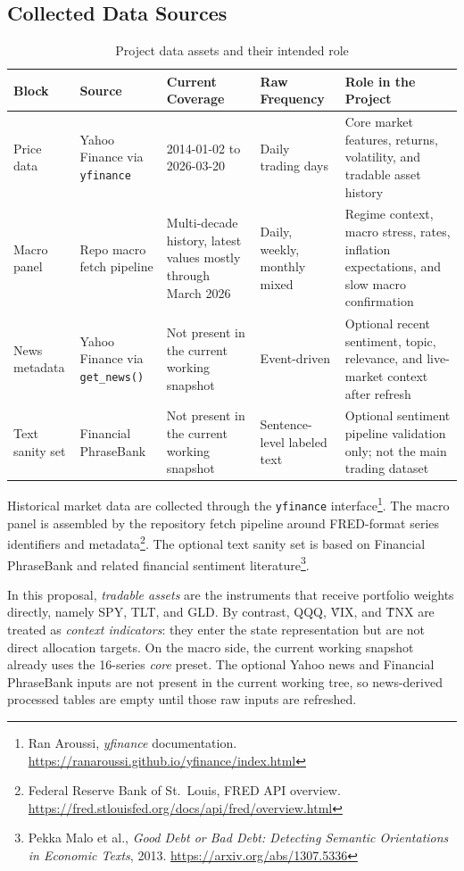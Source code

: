 \documentclass[11pt,a4paper]{article}
\newcommand{\fncite}[2]{\footnote{#1. \url{#2}}}
\begin{document}
\subsection{Collected Data Sources}

\begin{table}[H]
\centering
\caption{Project data assets and their intended role}
\begin{tabularx}{\textwidth}{@{}P{0.16\textwidth}P{0.17\textwidth}P{0.17\textwidth}P{0.12\textwidth}Y@{}}
\toprule
{}
\textbf{Block} & \textbf{Source} & \textbf{Current Coverage} & \textbf{Raw Frequency} & \textbf{Role in the Project} \\
\midrule
Price data & Yahoo Finance via \texttt{yfinance} & 2014-01-02 to 2026-03-20 & Daily trading days & Core market features, returns, volatility, and tradable asset history \\
Macro panel & Repo macro fetch pipeline & Multi-decade history, latest values mostly through March 2026 & Daily, weekly, monthly mixed & Regime context, macro stress, rates, inflation expectations, and slow macro confirmation \\
News metadata & Yahoo Finance via \texttt{get\_news()} & Not present in the current working snapshot & Event-driven & Optional recent sentiment, topic, relevance, and live-market context after refresh \\
Text sanity set & Financial PhraseBank & Not present in the current working snapshot & Sentence-level labeled text & Optional sentiment pipeline validation only; not the main trading dataset \\
\bottomrule
\end{tabularx}
\end{table}

Historical market data are collected through the \texttt{yfinance} interface\fncite{Ran Aroussi, \emph{yfinance} documentation}{https://ranaroussi.github.io/yfinance/index.html}. The macro panel is assembled by the repository fetch pipeline around FRED-format series identifiers and metadata\fncite{Federal Reserve Bank of St.~Louis, FRED API overview}{https://fred.stlouisfed.org/docs/api/fred/overview.html}. The optional text sanity set is based on Financial PhraseBank and related financial sentiment literature\fncite{Pekka Malo et al., \emph{Good Debt or Bad Debt: Detecting Semantic Orientations in Economic Texts}, 2013}{https://arxiv.org/abs/1307.5336}.

In this proposal, \emph{tradable assets} are the instruments that receive portfolio weights directly, namely SPY, TLT, and GLD. By contrast, QQQ, \^VIX, and \^TNX are treated as \emph{context indicators}: they enter the state representation but are not direct allocation targets. On the macro side, the current working snapshot already uses the 16-series \emph{core} preset. The optional Yahoo news and Financial PhraseBank inputs are not present in the current working tree, so news-derived processed tables are empty until those raw inputs are refreshed.
\end{document}
